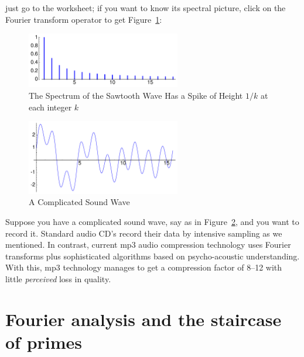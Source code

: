 \documentclass[11pt]{article}
\theoremstyle{plain}
\theoremstyle{definition}
\numberwithin{equation}{section}
\numberwithin{figure}{section}
\numberwithin{table}{section}
\begin{document}
\noindent just go to the worksheet; if you want to know its spectral picture, click on the Fourier transform operator to get Figure~\ref{fig:sawtooth-spectrum}:
    
 \bigskip


\begin{figure}[H]
\begin{center}
\includegraphics[width=0.6\textwidth]{illustrations/sawtooth-spectrum}
\end{center}
\caption{The Spectrum of the Sawtooth Wave Has a Spike of Height $1/k$ at 
each integer $k$\label{fig:sawtooth-spectrum}}
\end{figure}
  

       
\begin{figure}[H]
\begin{center}
\includegraphics[width=0.6\textwidth]{illustrations/complicated-wave}
\end{center}
\caption{A Complicated Sound Wave\label{fig:complicated-wave}}
\end{figure}
Suppose you have a complicated sound wave, say as in
Figure~\ref{fig:complicated-wave}, and you want to record it.
Standard audio CD's record their data by intensive sampling as we
mentioned. In contrast, current mp3 audio compression technology uses
Fourier transforms plus sophisticated algorithms based on
psycho-acoustic understanding. With this, mp3 technology manages to
get a compression factor of 8--12 with little {\em perceived} loss in
quality.
 
\section{Fourier analysis and the staircase of primes}
\end{document}
